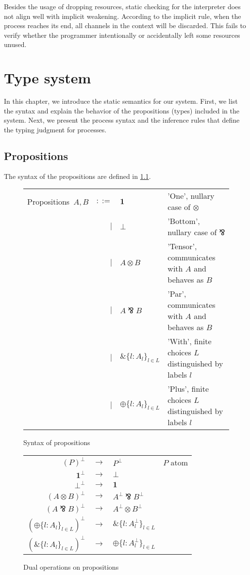 \documentclass[12pt, openany]{memoir}
\newcommand*{\pare}[0]{\mathbin{\bindnasrepma}}
\begin{document}
Besides the usage of dropping resources, static checking for the interpreter does not align well with implicit weakening. 
According to the implicit rule, when the process reaches its end, all channels in the context will be discarded. 
This fails to verify whether the programmer intentionally or accidentally left some resources unused.
\chapter{Type system}

In this chapter, we introduce the static semantics for our system. 
First, we list the syntax and explain the behavior of the propositions (types) included in the system.
Next, we present the process syntax and the inference rules that define the typing judgment for processes.
\section{Propositions} \label{sec:propsyntax}
The syntax of the propositions are defined in \cref{fig:propositions}.
\begin{figure}[H]
  \centering
  \begin{tabular}{c r l l}
    Propositions\ $A, B$ & $::=$ & $\textbf{1}$ & 'One', nullary case of $\otimes$ \\ 
    & $\mid$ & $\boldsymbol{\bot}$ & 'Bottom', nullary case of $\pare$  \\
    & $\mid$ & $A \otimes B$ & 'Tensor', communicates with $A$ and behaves as $B$  \\  
    & $\mid$ & $A \pare B$ & 'Par', communicates with $A$ and behaves as $B$ \\    
    & $\mid$ & $\& \{l : A_l\}_{l \in L}$ & 'With', finite choices $L$ distinguished by labels $l$ \\
    & $\mid$ & $\oplus \{l : A_l\}_{l \in L}$ & 'Plus', finite choices $L$ distinguished by labels $l$ 
   \end{tabular}
  \caption{Syntax of propositions}
  \label{fig:propositions}
\end{figure}
\begin{figure}[H]
  \centering
  \begin{tabular}{r c l l}
    $(P)^\bot$ & $\longrightarrow$ & $P^\bot$ & $P$ atom \\ 
    $\textbf{1}^\bot$ & $\longrightarrow$ & $\boldsymbol{\bot}$ & \\
    $\boldsymbol{\bot} ^ \bot$ & $\longrightarrow$ & $\textbf{1}$ & \\
    $(A \otimes B)^\bot$ & $\longrightarrow$ & $A^\bot\pare B^\bot$ &  \\  
    $(A \pare B)^\bot$ & $\longrightarrow$ & $A^\bot \otimes B^\bot$ & \\    
    $(\oplus\{l : A_l\}_{l \in L})^\bot$ & $\longrightarrow$ & $\& \{l : A_l^\bot\}_{l \in L}$ & \\ 
    $(\&\{l : A_l\}_{l \in L})^\bot$ & $\longrightarrow$ & $\oplus \{l : A_l^\bot\}_{l \in L}$ & \\
   \end{tabular}
  \caption{Dual operations on propositions}
  \label{fig:dual}
\end{figure}
\end{document}
